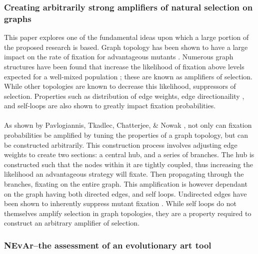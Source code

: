 \documentclass[10pt,a4paper]{article}
\begin{document}
\subsubsection{Creating arbitrarily strong amplifiers of natural selection on graphs \cite{graph amplifiers}}

This paper explores one of the fundamental ideas upon which a large portion of the proposed research is based.
Graph topology has been shown to have a large impact on the rate of fixation for advantageous mutants \cite{graph amplifiers, birth-death amplifiers, cooperation on graphs}.
Numerous graph structures have been found that increase the likelihood of fixation above levels expected for a well-mixed population \cite{evolution on graphs, birth-death amplifiers}; these are known as amplifiers of selection.
While other topologies are known to decrease this likelihood, suppressors of selection.
Properties such as distribution of edge weights, edge directionaility \cite{birth-death amplifiers}, and self-loops are also shown to greatly impact fixation probabilities.
\\\\
As shown by Pavlogiannis, Tkadlec, Chatterjee, \& Nowak \cite{graph amplifiers}, not only can fixation probabilities be amplified by tuning the properties of a graph topology, but can be constructed arbitrarily.
This construction process involves adjusting edge weights to create two sections: a central hub, and a series of branches.
The hub is constructed such that the nodes within it are tightly coupled, thus increasing the likelihood an advantageous strategy will fixate.
Then propagating through the branches, fixating on the entire graph.
This amplification is however dependant on the graph having both directed edges, and self loops.
Undirected edges have been shown to inherently suppress mutant fixation \cite{birth-death amplifiers}.
While self loops do not themselves amplify selection in graph topologies, they are a property required to construct an arbitrary amplifier of selection.


\subsubsection{NEvAr–the assessment of an evolutionary art tool \cite{nevar}}
\end{document}
